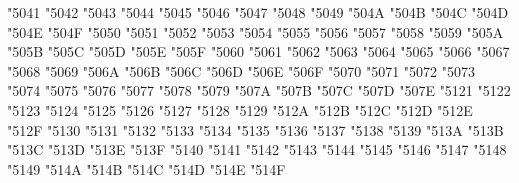 {\Uchar\jis"5041 %
\Uchar\jis"5042 %
\Uchar\jis"5043 %
\Uchar\jis"5044 %
\Uchar\jis"5045 %
\Uchar\jis"5046 %
\Uchar\jis"5047 %
\Uchar\jis"5048 %
\Uchar\jis"5049 %
\Uchar\jis"504A %
\Uchar\jis"504B %
\Uchar\jis"504C %
\Uchar\jis"504D %
\Uchar\jis"504E %
\Uchar\jis"504F %
\Uchar\jis"5050 %
\Uchar\jis"5051 %
\Uchar\jis"5052 %
\Uchar\jis"5053 %
\Uchar\jis"5054 %
\Uchar\jis"5055 %
\Uchar\jis"5056 %
\Uchar\jis"5057 %
\Uchar\jis"5058 %
\Uchar\jis"5059 %
\Uchar\jis"505A %
\Uchar\jis"505B %
\Uchar\jis"505C %
\Uchar\jis"505D %
\Uchar\jis"505E %
\Uchar\jis"505F %
\Uchar\jis"5060 %
\Uchar\jis"5061 %
\Uchar\jis"5062 %
\Uchar\jis"5063 %
\Uchar\jis"5064 %
\Uchar\jis"5065 %
\Uchar\jis"5066 %
\Uchar\jis"5067 %
\Uchar\jis"5068 %
\Uchar\jis"5069 %
\Uchar\jis"506A %
\Uchar\jis"506B %
\Uchar\jis"506C %
\Uchar\jis"506D %
\Uchar\jis"506E %
\Uchar\jis"506F %
\Uchar\jis"5070 %
\Uchar\jis"5071 %
\Uchar\jis"5072 %
\Uchar\jis"5073 %
\Uchar\jis"5074 %
\Uchar\jis"5075 %
\Uchar\jis"5076 %
\Uchar\jis"5077 %
\Uchar\jis"5078 %
\Uchar\jis"5079 %
\Uchar\jis"507A %
\Uchar\jis"507B %
\Uchar\jis"507C %
\Uchar\jis"507D %
\Uchar\jis"507E %
\Uchar\jis"5121 %
\Uchar\jis"5122 %
\Uchar\jis"5123 %
\Uchar\jis"5124 %
\Uchar\jis"5125 %
\Uchar\jis"5126 %
\Uchar\jis"5127 %
\Uchar\jis"5128 %
\Uchar\jis"5129 %
\Uchar\jis"512A %
\Uchar\jis"512B %
\Uchar\jis"512C %
\Uchar\jis"512D %
\Uchar\jis"512E %
\Uchar\jis"512F %
\Uchar\jis"5130 %
\Uchar\jis"5131 %
\Uchar\jis"5132 %
\Uchar\jis"5133 %
\Uchar\jis"5134 %
\Uchar\jis"5135 %
\Uchar\jis"5136 %
\Uchar\jis"5137 %
\Uchar\jis"5138 %
\Uchar\jis"5139 %
\Uchar\jis"513A %
\Uchar\jis"513B %
\Uchar\jis"513C %
\Uchar\jis"513D %
\Uchar\jis"513E %
\Uchar\jis"513F %
\Uchar\jis"5140 %
\Uchar\jis"5141 %
\Uchar\jis"5142 %
\Uchar\jis"5143 %
\Uchar\jis"5144 %
\Uchar\jis"5145 %
\Uchar\jis"5146 %
\Uchar\jis"5147 %
\Uchar\jis"5148 %
\Uchar\jis"5149 %
\Uchar\jis"514A %
\Uchar\jis"514B %
\Uchar\jis"514C %
\Uchar\jis"514D %
\Uchar\jis"514E %
\Uchar\jis"514F %
}
